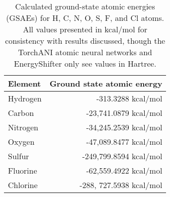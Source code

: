 \begin{table}[hb!]
\label{tbl:GSAEs}
\center 
    \caption[$\omega$B97X ground-state atomic energies used in ANI-2xr]{Calculated ground-state atomic energies (GSAEs) for H, C, N, O, S, F, and Cl atoms. All values presented in kcal/mol for consistency with results discussed, though the TorchANI atomic neural networks and EnergyShifter only see values in Hartree.}
    \begin{tabular}{l r}
    \toprule
    Element & Ground state atomic energy \\
    \midrule
    Hydrogen & -313.3288 kcal/mol \\
    Carbon & -23,741.0879 kcal/mol \\
    Nitrogen & -34,245.2539 kcal/mol \\
    Oxygen & -47,089.8477 kcal/mol \\
    Sulfur & -249,799.8594 kcal/mol \\
    Fluorine & -62,559.4922 kcal/mol \\
    Chlorine & -288,  727.5938 kcal/mol \\
    \bottomrule
    \end{tabular}
\end{table}



